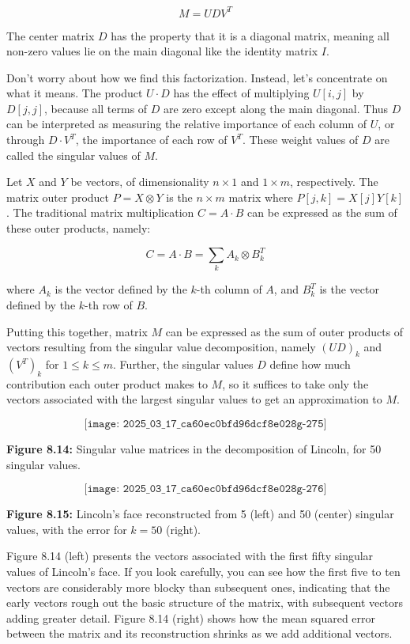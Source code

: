 \documentclass[10pt]{article}
\begin{document}
\[
M=U D V^{T}
\]

The center matrix \(D\) has the property that it is a diagonal matrix, meaning all non-zero values lie on the main diagonal like the identity matrix \(I\).

Don't worry about how we find this factorization. Instead, let's concentrate on what it means. The product \(U \cdot D\) has the effect of multiplying \(U[i, j]\) by \(D[j, j]\), because all terms of \(D\) are zero except along the main diagonal. Thus \(D\) can be interpreted as measuring the relative importance of each column of \(U\), or through \(D \cdot V^{T}\), the importance of each row of \(V^{T}\). These weight values of \(D\) are called the singular values of \(M\).

Let \(X\) and \(Y\) be vectors, of dimensionality \(n \times 1\) and \(1 \times m\), respectively. The matrix outer product \(P=X \otimes Y\) is the \(n \times m\) matrix where \(P[j, k]=X[j] Y[k]\). The traditional matrix multiplication \(C=A \cdot B\) can be expressed as the sum of these outer products, namely:

\[
C=A \cdot B=\sum_{k} A_{k} \otimes B_{k}^{T}
\]

where \(A_{k}\) is the vector defined by the \(k\)-th column of \(A\), and \(B_{k}^{T}\) is the vector defined by the \(k\)-th row of \(B\).

Putting this together, matrix \(M\) can be expressed as the sum of outer products of vectors resulting from the singular value decomposition, namely \((U D)_{k}\) and \(\left(V^{T}\right)_{k}\) for \(1 \leq k \leq m\). Further, the singular values \(D\) define how much contribution each outer product makes to \(M\), so it suffices to take only the vectors associated with the largest singular values to get an approximation to \(M\).

\[
\texttt{[image: 2025\_03\_17\_ca60ec0bfd96dcf8e028g-275]}
\]

\textbf{Figure 8.14:} Singular value matrices in the decomposition of Lincoln, for 50 singular values.

\[
\texttt{[image: 2025\_03\_17\_ca60ec0bfd96dcf8e028g-276]}
\]

\textbf{Figure 8.15:} Lincoln's face reconstructed from 5 (left) and 50 (center) singular values, with the error for \(k=50\) (right).

Figure 8.14 (left) presents the vectors associated with the first fifty singular values of Lincoln's face. If you look carefully, you can see how the first five to ten vectors are considerably more blocky than subsequent ones, indicating that the early vectors rough out the basic structure of the matrix, with subsequent vectors adding greater detail. Figure 8.14 (right) shows how the mean squared error between the matrix and its reconstruction shrinks as we add additional vectors.
\end{document}
